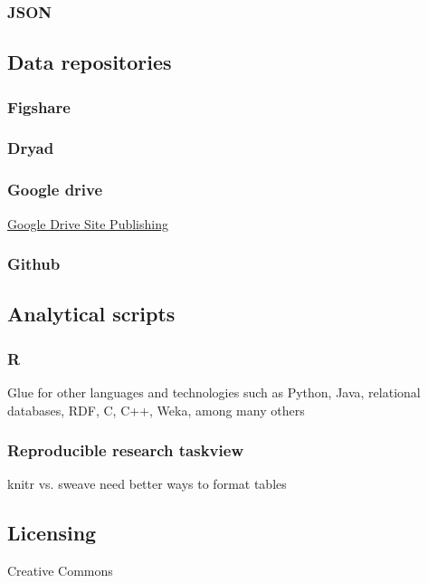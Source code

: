 \documentclass[twoside]{article}
\begin{document}
\begin{multicols}{2}
\subsubsection{JSON}

\subsection{Data repositories}

\subsubsection{Figshare}

\subsubsection{Dryad}

\subsubsection{Google drive}
\href{http://googleappsdeveloper.blogspot.com/2012/11/announcing-google-drive-site-publishing.html}{Google Drive Site Publishing
}

\subsubsection{Github}



\subsection{Analytical scripts}

\subsubsection{R}
Glue for other languages and technologies such as Python, Java, relational databases, RDF, C, C++, Weka, among many others

\subsubsection{Reproducible research taskview}
knitr vs. sweave
need better ways to format tables



\subsection{Licensing}
Creative Commons


\end{multicols}
\end{document}
